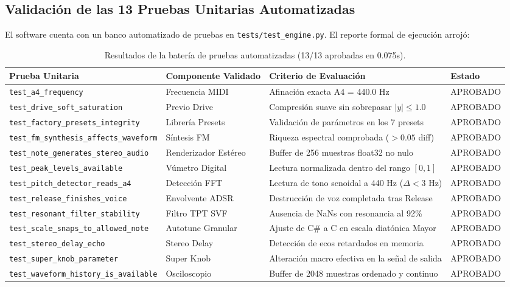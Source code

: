 \documentclass[11pt,a4paper]{article}
\begin{document}
\subsection{Validación de las 13 Pruebas Unitarias Automatizadas}
El software cuenta con un banco automatizado de pruebas en \texttt{tests/test\_engine.py}. El reporte formal de ejecución arrojó:

\begin{table}[h]
\centering
\small
\begin{tabular}{@{}llll@{}}
\toprule
\textbf{Prueba Unitaria} & \textbf{Componente Validado} & \textbf{Criterio de Evaluación} & \textbf{Estado} \\ \midrule
\texttt{test\_a4\_frequency} & Frecuencia MIDI & Afinación exacta A4 = 440.0 Hz & APROBADO \\
\texttt{test\_drive\_soft\_saturation} & Previo Drive & Compresión suave sin sobrepasar $|y| \le 1.0$ & APROBADO \\
\texttt{test\_factory\_presets\_integrity} & Librería Presets & Validación de parámetros en los 7 presets & APROBADO \\
\texttt{test\_fm\_synthesis\_affects\_waveform} & Síntesis FM & Riqueza espectral comprobada ($>0.05$ diff) & APROBADO \\
\texttt{test\_note\_generates\_stereo\texttt{\_audio}} & Renderizador Estéreo & Buffer de 256 muestras float32 no nulo & APROBADO \\
\texttt{test\_peak\_levels\_available} & Vúmetro Digital & Lectura normalizada dentro del rango $[0, 1]$ & APROBADO \\
\texttt{test\_pitch\_detector\_reads\_a4} & Detección FFT & Lectura de tono senoidal a 440 Hz ($\Delta < 3$ Hz) & APROBADO \\
\texttt{test\_release\_finishes\_voice} & Envolvente ADSR & Destrucción de voz completada tras Release & APROBADO \\
\texttt{test\_resonant\_filter\_stability} & Filtro TPT SVF & Ausencia de NaNs con resonancia al 92\% & APROBADO \\
\texttt{test\_scale\_snaps\_to\_allowed\_note} & Autotune Granular & Ajuste de C\# a C en escala diatónica Mayor & APROBADO \\
\texttt{test\_stereo\_delay\_echo} & Stereo Delay & Detección de ecos retardados en memoria & APROBADO \\
\texttt{test\_super\_knob\_parameter} & Super Knob & Alteración macro efectiva en la señal de salida & APROBADO \\
\texttt{test\_waveform\_history\_is\_available} & Osciloscopio & Buffer de 2048 muestras ordenado y continuo & APROBADO \\ \bottomrule
\end{tabular}
\caption{Resultados de la batería de pruebas automatizadas (13/13 aprobadas en 0.075s).}
\end{table}
\end{document}

